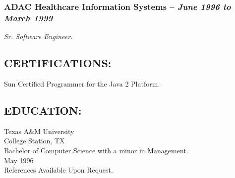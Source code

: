 \documentclass[10pt]{report}
\begin{document}
  \subsubsection*{ADAC Healthcare Information Systems -- \emph{June 1996 to
  March 1999}}
    \emph{Sr. Software Engineer.}
%
%
%
%
%
%
\subsection*{CERTIFICATIONS:}
Sun Certified Programmer for the Java 2 Platform.

\subsection*{EDUCATION:}
Texas A\&M University \\
College Station, TX \\
Bachelor of Computer Science with a minor in Management. \\
May 1996 \\

References Available Upon Request.
\end{document}
